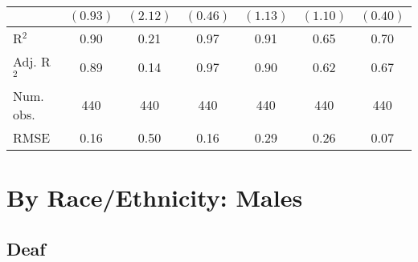 \documentclass[fullpage]{paper}
\begin{document}
\begin{center}
\begin{longtable}{l c c c c c c }
            & $(0.93)$      & $(2.12)$      & $(0.46)$       & $(1.13)$       & $(1.10)$      & $(0.40)$      \\
\hline
R$^2$       & 0.90          & 0.21          & 0.97           & 0.91           & 0.65          & 0.70          \\
Adj. R$^2$  & 0.89          & 0.14          & 0.97           & 0.90           & 0.62          & 0.67          \\
Num. obs.   & 440           & 440           & 440            & 440            & 440           & 440           \\
RMSE        & 0.16          & 0.50          & 0.16           & 0.29           & 0.26          & 0.07          \\
\end{longtable}
\end{center}
\section{ By Race/Ethnicity: Males }

\subsection{ Deaf }
\end{document}
